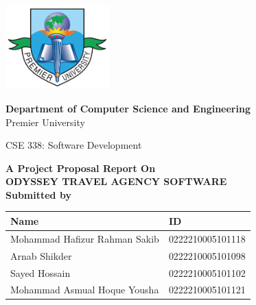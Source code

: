 \thispagestyle{empty} %
\begin{titlepage}
    \centering
    \begin{center}
        \includegraphics[width=0.3\textwidth]{./Images/PUClogo.png} %
    \end{center}
\begin{center}
    \textbf{Department of Computer Science and Engineering}\\
    Premier University
\end{center}
\begin{center}
    \textnormal{ CSE 338: Software Development }
\end{center}
    \vspace{0.5in}
    \small
    \textbf{A Project Proposal Report On}\\
    \vspace{0.5in}
    \large
    \uppercase{\textbf{Odyssey Travel Agency Software}}\\
    \vspace{0.5in}
    \large
    \textbf {Submitted by}\\
    \begin{center}
        \renewcommand{\arraystretch}{1.5} %
        \begin{tabular}{|>{\raggedright\arraybackslash}p{}|p{}|} %
        \hline
        \textbf{Name} & \textbf{ID} \\
        \hline
        Mohammad Hafizur Rahman Sakib & 0222210005101118 \\
        \hline
        Arnab Shikder & 0222210005101098 \\
        \hline
        Sayed Hossain & 0222210005101102 \\
        \hline
        Mohammad Asmual Hoque Yousha & 0222210005101121 \\
        \hline
        \end{tabular}
        \end{center}
    \vspace{0.5in}
 

\end{titlepage}
